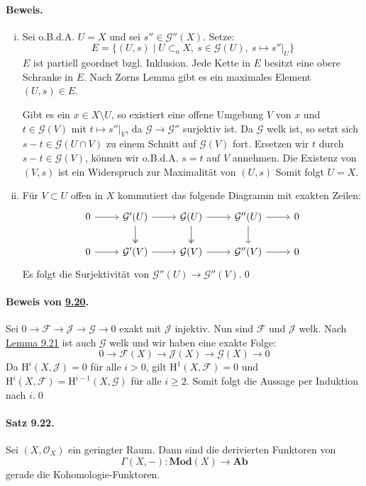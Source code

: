 \paragraph{Beweis.}
\begin{enumerate}[(i)]
\item Sei o.B.d.A. $U=X$ und sei $s''\in\mathcal{G}''(X)$. Setze:
\[E=\{(U,s)\mid U\subset_\text{o}X,\ s\in\mathcal{G}(U),\ s\mapsto s''|_U \} \]
$E$ ist partiell geordnet bzgl. Inklusion. Jede Kette in $E$ besitzt eine obere Schranke in $E$. Nach Zorns Lemma gibt es ein maximales Element $(U,s)\in E$.

Gibt es ein $x\in X\setminus U$, so existiert eine offene Umgebung $V$ von $x$ und $t\in\mathcal{G}(V)$ mit $t\mapsto s''|_V$, da $\mathcal{G}\to\mathcal{G}''$ surjektiv ist. Da $\mathcal{G}$ welk ist, so setzt sich $s-t\in\mathcal{G}(U\cap V)$ zu einem Schnitt auf $\mathcal{G}(V)$ fort. Ersetzen wir $t$ durch $s-t\in\mathcal{G}(V)$, können wir o.B.d.A. $s=t$ auf $V$ annehmen. Die Existenz von $(V,s)$ ist ein Widerspruch zur Maximalität von $(U,s)$ Somit folgt $U=X$.
\item Für $V\subset U$ offen in $X$ kommutiert das folgende Diagramm mit exakten Zeilen:
\[\begin{tikzcd}
0 \rar & \mathcal{G}'(U)\rar\dar[two heads] & \mathcal{G}(U)\rar\dar[two heads] & \mathcal{G}''(U)\rar\dar & 0\\
0 \rar & \mathcal{G}'(V)\rar & \mathcal{G}(V)\rar & \mathcal{G}''(V)\rar & 0
\end{tikzcd} \]
Es folgt die Surjektivität von $\mathcal{G}''(U)\to\mathcal{G}''(V)$.\qed
\end{enumerate}

\paragraph{Beweis von \hyperref[9.20]{9.20}.} Sei $0\to\mathcal{F}\to\mathcal{J}\to\mathcal{G}\to 0$ exakt mit $\mathcal{J}$ injektiv. Nun sind $\mathcal{F}$ und $\mathcal{J}$ welk. Nach \hyperref[9.21]{Lemma 9.21} ist auch $\mathcal{G}$ welk und wir haben eine exakte Folge:
\[0\longrightarrow\mathcal{F}(X)\longrightarrow\mathcal{J}(X)\longrightarrow\mathcal{G}(X)\longrightarrow 0 \]
Da $\mathrm{H}^i(X,\mathcal{J})=0$ für alle $i>0$, gilt $\mathrm{H}^1(X,\mathcal{F})=0$ und $\mathrm{H}^i(X,\mathcal{F})=\mathrm{H}^{i-1}(X,\mathcal{G})$ für alle $i\geq 2$. Somit folgt die Aussage per Induktion nach $i$.\qed

\paragraph{Satz 9.22.}\label{9.22} Sei $(X,\mathcal{O}_X)$ ein geringter Raum. Dann sind die derivierten Funktoren von
\[\Gamma(X,-): \mathbf{Mod}(X)\to\mathbf{Ab} \]
gerade die Kohomologie-Funktoren.

